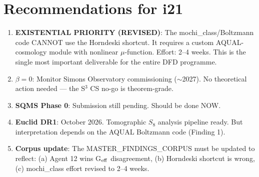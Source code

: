 \documentclass[11pt]{article}
\begin{document}
\section*{Recommendations for i21}

\begin{enumerate}
\item \textbf{EXISTENTIAL PRIORITY (REVISED)}: The mochi\_class/Boltzmann code
  CANNOT use the Horndeski shortcut. It requires a custom AQUAL-cosmology
  module with nonlinear $\mu$-function. Effort: 2--4 weeks. This is the
  single most important deliverable for the entire DFD programme.
\item \textbf{$\beta = 0$}: Monitor Simons Observatory commissioning
  ($\sim$2027). No theoretical action needed --- the S$^3$ CS no-go is
  theorem-grade.
\item \textbf{SQMS Phase 0}: Submission still pending. Should be done NOW.
\item \textbf{Euclid DR1}: October 2026. Tomographic $S_8$ analysis pipeline
  ready. But interpretation depends on the AQUAL Boltzmann code (Finding 1).
\item \textbf{Corpus update}: The MASTER\_FINDINGS\_CORPUS must be updated to
  reflect: (a) Agent 12 wins G$_{\rm eff}$ disagreement, (b) Horndeski
  shortcut is wrong, (c) mochi\_class effort revised to 2--4 weeks.
\end{enumerate}
\end{document}
